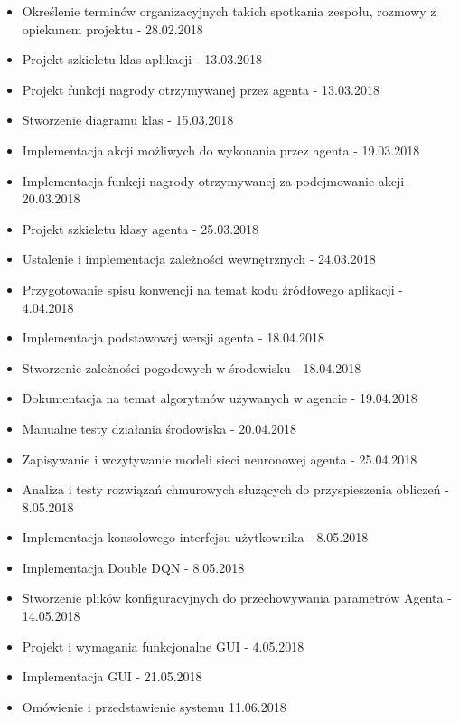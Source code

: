 \documentclass{article}
\begin{document}
\begin{itemize}
\item Określenie terminów organizacyjnych takich spotkania zespołu, rozmowy z opiekunem projektu - 28.02.2018
\item Projekt szkieletu klas aplikacji - 13.03.2018
\item Projekt funkcji nagrody otrzymywanej przez agenta - 13.03.2018
\item Stworzenie diagramu klas - 15.03.2018
\item Implementacja akcji możliwych do wykonania przez agenta  - 19.03.2018
\item Implementacja funkcji nagrody otrzymywanej za podejmowanie akcji - 20.03.2018
\item Projekt szkieletu klasy agenta - 25.03.2018
\item Ustalenie i implementacja zależności wewnętrznych - 24.03.2018
\item Przygotowanie spisu konwencji na temat kodu źródłowego aplikacji - 4.04.2018
\item Implementacja podstawowej wersji agenta - 18.04.2018
\item Stworzenie zależności pogodowych w środowisku - 18.04.2018
\item Dokumentacja na temat algorytmów używanych w agencie - 19.04.2018
\item Manualne testy działania środowiska - 20.04.2018
\item Zapisywanie i wczytywanie modeli sieci neuronowej agenta - 25.04.2018
\item Analiza i testy rozwiązań chmurowych służących do przyspieszenia obliczeń - 8.05.2018
\item Implementacja konsolowego interfejsu użytkownika - 8.05.2018
\item Implementacja Double DQN - 8.05.2018
\item Stworzenie plików konfiguracyjnych do przechowywania parametrów Agenta - 14.05.2018
\item Projekt i wymagania funkcjonalne GUI - 4.05.2018
\item Implementacja GUI - 21.05.2018
\item Omówienie i przedstawienie systemu 11.06.2018
\end{itemize}
\end{document}
